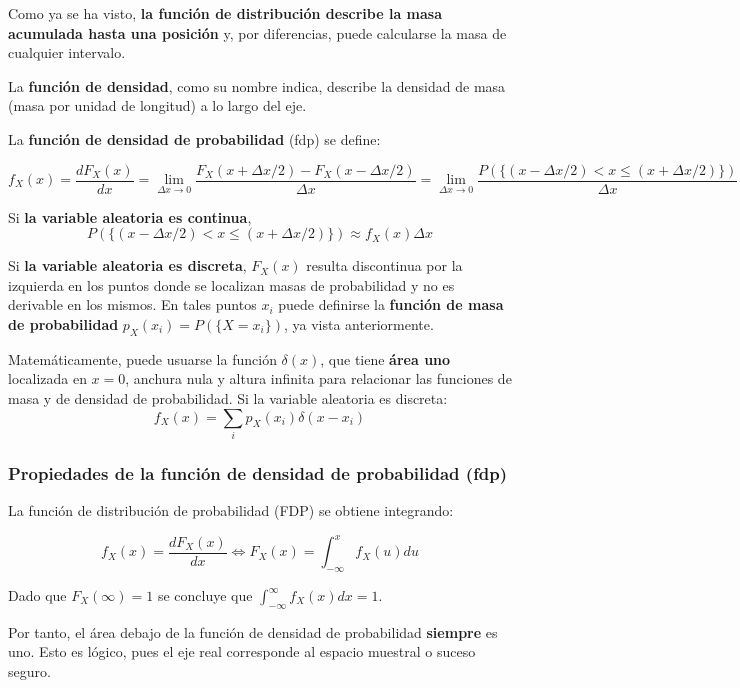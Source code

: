\documentclass[11pt]{article}
\begin{document}
Como ya se ha visto, \textbf{la función de distribución describe la masa
acumulada hasta una posición} y, por diferencias, puede calcularse la
masa de cualquier intervalo.

La \textbf{función de densidad}, como su nombre indica, describe la
densidad de masa (masa por unidad de longitud) a lo largo del eje.

    La \textbf{función de densidad de probabilidad} (fdp) se define:

\[f_X(x) =\frac{dF_X(x)}{dx}=\lim \limits_{\Delta x \to 0} \frac{F_X(x+\Delta x/2)-F_X(x-\Delta x/2)}{\Delta x}= 
\lim \limits_{\Delta x \to 0} \frac{P\left(\{(x-\Delta x/2) < x \leq (x+\Delta x/2)\}\right)}{\Delta x}
\]

Si \textbf{la variable aleatoria es continua},
\[P\left(\{(x-\Delta x/2) < x \leq (x+\Delta x/2)\}\right) \approx f_X(x)\Delta x\]

Si \textbf{la variable aleatoria es discreta}, \(F_X(x)\) resulta
discontinua por la izquierda en los puntos donde se localizan masas de
probabilidad y no es derivable en los mismos. En tales puntos \({x_i}\)
puede definirse la \textbf{función de masa de probabilidad}
\(p_X(x_i)=P(\{X=x_i\})\), ya vista anteriormente.

Matemáticamente, puede usuarse la función \(\delta(x)\), que tiene
\textbf{área uno} localizada en \(x=0\), anchura nula y altura infinita
para relacionar las funciones de masa y de densidad de probabilidad. Si
la variable aleatoria es discreta:
\[f_X(x)=\sum_{i}p_X(x_i)\delta(x-x_i)\]

    \hypertarget{propiedades-de-la-funciuxf3n-de-densidad-de-probabilidad-fdp}{%
\subsubsection*{Propiedades de la función de densidad de probabilidad
(fdp)}\label{propiedades-de-la-funciuxf3n-de-densidad-de-probabilidad-fdp}}

La función de distribución de probabilidad (FDP) se obtiene integrando:

\[f_X(x) = \frac{dF_X(x)}{dx} \iff F_X(x)=\int_{-\infty}^x f_X(u)du\]

Dado que \(F_X(\infty)=1\) se concluye que
\(\int_{-\infty}^{\infty} f_X(x)dx = 1\).

Por tanto, el área debajo de la función de densidad de probabilidad
\textbf{siempre} es uno. Esto es lógico, pues el eje real corresponde al
espacio muestral o suceso seguro.
\end{document}
